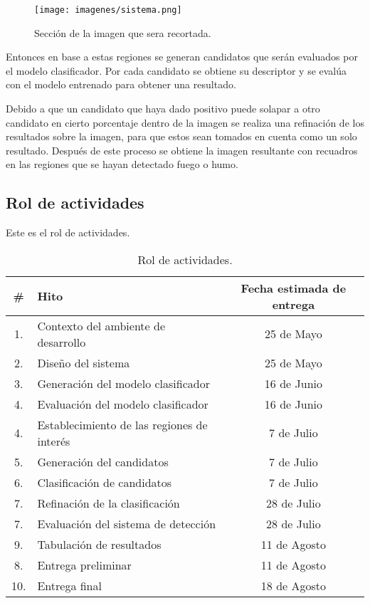 \begin{figure}[H]
\centering
{\texttt{[image: imagenes/sistema.png]}}
\caption{Sección de la imagen que sera recortada.}
\label{fig:sectorRecorte}
\end{figure}

Entonces en base a estas regiones se generan candidatos que serán evaluados por el modelo clasificador. Por cada candidato se obtiene su descriptor y se evalúa con el modelo entrenado para obtener una resultado.

Debido a que un candidato que haya dado positivo puede solapar a otro candidato en cierto porcentaje dentro de la imagen se realiza una refinación de los resultados sobre la imagen, para que estos sean tomados en cuenta como un solo resultado. Después de este proceso se obtiene la imagen resultante con recuadros en las regiones que se hayan detectado fuego o humo.

\subsection{Rol de actividades}

\noindent Este es el rol de actividades.

\begin{table}[h!]
\begin{center}
\begin{tabular}{|c|p{8 cm}|c|}
\hline 
\textbf{\#} & \textbf{ Hito} & \textbf{Fecha estimada de entrega} \\ 
\hline \hline
1. & Contexto del ambiente de desarrollo & 25 de Mayo \\ 
\hline 
2. & Diseño del sistema & 25 de Mayo \\ 
\hline 
3. & Generación del modelo clasificador & 16 de Junio \\ 
\hline 
4. & Evaluación del modelo clasificador & 16 de Junio \\ 
\hline 
4. & Establecimiento de las regiones de interés & 7 de Julio \\ 
\hline 
5. & Generación del candidatos & 7 de Julio \\ 
\hline 
6. & Clasificación de candidatos & 7 de Julio \\ 
\hline 
7. & Refinación de la clasificación & 28 de Julio \\ 
\hline 
7. & Evaluación del sistema de detección & 28 de Julio \\ 
\hline 
9. & Tabulación de resultados & 11 de Agosto \\ 
\hline 
8. & Entrega preliminar & 11 de Agosto \\ 
\hline 
10. & Entrega final & 18 de Agosto \\ 
\hline 
\end{tabular} 
\caption{Rol de actividades.}
\end{center}
\end{table}

